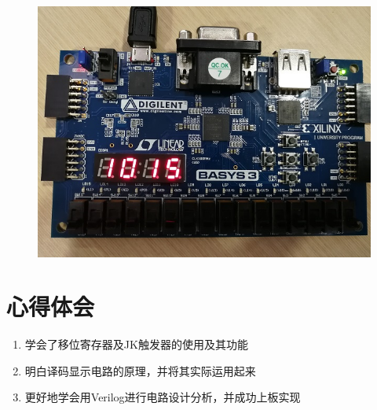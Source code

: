 \documentclass[11pt,UTF8]{ctexart}
\begin{document}
\begin{figure}[H]
    \centering
    \includegraphics[width=0.8\linewidth]{fig/b2.jpg}
\end{figure}

\section{心得体会}
\begin{enumerate}
    \item 学会了移位寄存器及JK触发器的使用及其功能
    \item 明白译码显示电路的原理，并将其实际运用起来
    \item 更好地学会用Verilog进行电路设计分析，并成功上板实现
\end{enumerate}
\end{document}
